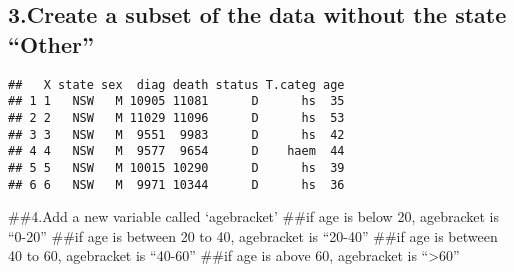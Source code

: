 \documentclass[
]{article}
\newenvironment{Shaded}{\begin{snugshade}}{\end{snugshade}}
\newcommand{\KeywordTok}[1]{\textcolor[rgb]{0.13,0.29,0.53}{\textbf{#1}}}
\newcommand{\NormalTok}[1]{#1}
\newcommand{\OperatorTok}[1]{\textcolor[rgb]{0.81,0.36,0.00}{\textbf{#1}}}
\newcommand{\StringTok}[1]{\textcolor[rgb]{0.31,0.60,0.02}{#1}}
\begin{document}
\hypertarget{create-a-subset-of-the-data-without-the-state-other}{%
\subsection{3.Create a subset of the data without the state
``Other''}\label{create-a-subset-of-the-data-without-the-state-other}}

\begin{verbatim}
##   X state sex  diag death status T.categ age
## 1 1   NSW   M 10905 11081      D      hs  35
## 2 2   NSW   M 11029 11096      D      hs  53
## 3 3   NSW   M  9551  9983      D      hs  42
## 4 4   NSW   M  9577  9654      D    haem  44
## 5 5   NSW   M 10015 10290      D      hs  39
## 6 6   NSW   M  9971 10344      D      hs  36
\end{verbatim}

\#\#4.Add a new variable called `agebracket' \#\#if age is below 20,
agebracket is ``0-20'' \#\#if age is between 20 to 40, agebracket is
``20-40'' \#\#if age is between 40 to 60, agebracket is ``40-60'' \#\#if
age is above 60, agebracket is ``\textgreater60''

\begin{Shaded}
\end{Shaded}
\end{document}
